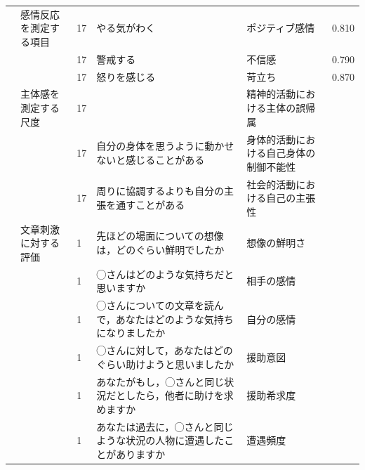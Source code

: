 \begin{landscape}
\begin{longtable}{p{2cm}p{2cm}p{2cm}p{6cm}p{2cm}p{2cm}}
                                 & 感情反応を測定する項目                      & 17  & やる気がわく                                              & ポジティブ感情              & 0.810   \\
                                 &                                  & 17  & 警戒する                                                & 不信感                  & 0.790   \\
                                 &                                  & 17  & 怒りを感じる                                              & 苛立ち                  & 0.870   \\
        \citet{Niikuni202192}    & 主体感を測定する尺度                       & 17  &                                                     & 精神的活動における主体の誤帰属      &         \\
                                 &                                  & 17  & 自分の身体を思うように動かせないと感じることがある                           & 身体的活動における自己身体の制御不能性  &         \\
                                 &                                  & 17  & 周りに協調するよりも自分の主張を通すことがある                             & 社会的活動における自己の主張性      &         \\
        \citet{Toyoda202192}     & 文章刺激に対する評価                       & 1   & 先ほどの場面についての想像は，どのぐらい鮮明でしたか                          & 想像の鮮明さ               &         \\
                                 &                                  & 1   & ◯さんはどのような気持ちだと思いますか                                 & 相手の感情                &         \\
                                 &                                  & 1   & ◯さんについての文章を読んで，あなたはどのような気持ちになりましたか                  & 自分の感情                &         \\
                                 &                                  & 1   & ◯さんに対して，あなたはどのぐらい助けようと思いましたか                        & 援助意図                 &         \\
                                 &                                  & 1   & あなたがもし，◯さんと同じ状況だとしたら，他者に助けを求めますか                    & 援助希求度                &         \\
                                 &                                  & 1   & あなたは過去に，◯さんと同じような状況の人物に遭遇したことがありますか                 & 遭遇頻度                 &         \\

\end{longtable}
\end{landscape}
